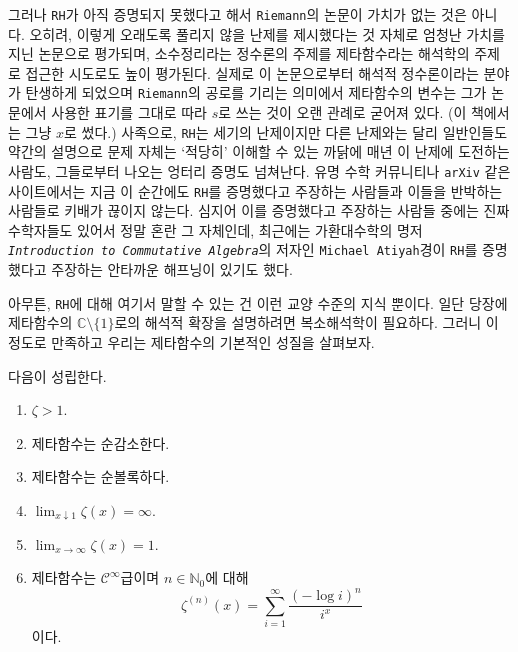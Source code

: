 그러나 \texttt{RH}가 아직 증명되지 못했다고 해서 \texttt{Riemann}의 논문이 가치가 없는 것은 아니다. 오히려, 이렇게 오래도록 풀리지 않을 난제를 제시했다는 것 자체로 엄청난 가치를 지닌 논문으로 평가되며, 소수정리라는 정수론의 주제를 제타함수라는 해석학의 주제로 접근한 시도로도 높이 평가된다. 실제로 이 논문으로부터 해석적 정수론이라는 분야가 탄생하게 되었으며 \texttt{Riemann}의 공로를 기리는 의미에서 제타함수의 변수는 그가 논문에서 사용한 표기를 그대로 따라 $s$로 쓰는 것이 오랜 관례로 굳어져 있다. (이 책에서는 그냥 $x$로 썼다.) 사족으로, \texttt{RH}는 세기의 난제이지만 다른 난제와는 달리 일반인들도 약간의 설명으로 문제 자체는 `적당히' 이해할 수 있는 까닭에 매년 이 난제에 도전하는 사람도, 그들로부터 나오는 엉터리 증명도 넘쳐난다. 유명 수학 커뮤니티나 \texttt{arXiv} 같은 사이트에서는 지금 이 순간에도 \texttt{RH}를 증명했다고 주장하는 사람들과 이들을 반박하는 사람들로 키배가 끊이지 않는다. 심지어 이를 증명했다고 주장하는 사람들 중에는 진짜 수학자들도 있어서 정말 혼란 그 자체인데, 최근에는 가환대수학의 명저 \texttt{\textit{Introduction to Commutative Algebra}}의 저자인 \texttt{Michael Atiyah}경이 \texttt{RH}를 증명했다고 주장하는 안타까운 해프닝이 있기도 했다.

아무튼, \texttt{RH}에 대해 여기서 말할 수 있는 건 이런 교양 수준의 지식 뿐이다. 일단 당장에 제타함수의 $\mathbb{C}\setminus\{1\}$로의 해석적 확장을 설명하려면 복소해석학이 필요하다. 그러니 이 정도로 만족하고 우리는 제타함수의 기본적인 성질을 살펴보자.

\begin{theorem}
    다음이 성립한다.
    \begin{enumerate}
        \item $\zeta>1$.
        \item 제타함수는 순감소한다.
        \item 제타함수는 순볼록하다.
        \item $\lim_{x\downarrow1}\zeta(x)=\infty$.
        \item $\lim_{x\to\infty}\zeta(x)=1$.
        \item 제타함수는 $\mathcal{C}^\infty$급이며 $n\in\mathbb{N}_0$에 대해
        \begin{equation*}
            \zeta^{(n)}(x)=\sum_{i=1}^\infty\frac{(-\log i)^n}{i^x}
        \end{equation*}
        이다.
    \end{enumerate}
\end{theorem}

